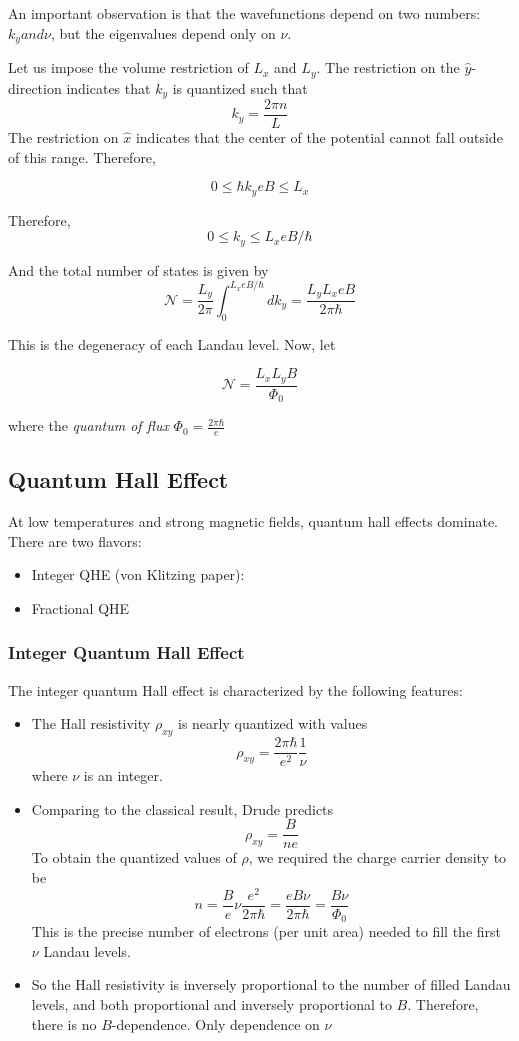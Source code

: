 \documentclass[10pt]{article}
\begin{document}
An important observation is that the wavefunctions depend on two numbers: $k_{y} and \nu$, but the eigenvalues depend only on $\nu$.

Let us impose the volume restriction of $L_{x}$ and $L_{y}$. The restriction on the $\hat{y}$-direction indicates that $k_{y}$ is
quantized such that
$$
k_{y} = \frac{2\pi n}{L}
$$
The restriction on $\hat{x}$ indicates that the center of the potential cannot fall outside of this range. Therefore,

$$
0 \leq \hbar k_{y}{eB} \leq L_{x}
$$

Therefore,
$$
0 \leq k_{y} \leq L_{x}eB/\hbar
$$

And the total number of states is given by
$$
\mathcal{N} = \frac{L_{y}}{2\pi} \int_{0}^{L_{x}eB/\hbar} dk_{y} =  \frac{L_{y}L_{x}eB}{2\pi\hbar}
$$

This is the degeneracy of each Landau level. Now, let

$$
\mathcal{N} = \frac{L_{x}L_{y}B}{\Phi_{0}}
$$

where the \emph{quantum of flux} $\Phi_{0} = \frac{2\pi\hbar}{e}$
\subsection{Quantum Hall Effect}

At low temperatures and strong magnetic fields, quantum hall effects dominate. There are two flavors:
\begin{itemize}
  \item Integer QHE (von Klitzing paper):
  \item Fractional QHE
\end{itemize}

\subsubsection{Integer Quantum Hall Effect}
The integer quantum Hall effect is characterized by the following features:
\begin{itemize}
  \item The Hall resistivity $\rho_{xy}$ is nearly quantized with values
  $$
    \rho_{xy} = \frac{2\pi\hbar}{e^{2}}\frac{1}{\nu}
  $$
  where $\nu$ is an integer.
  \item Comparing to the classical result, Drude predicts
  $$
    \rho_{xy} = \frac{B}{ne}
  $$
  To obtain the quantized values of $\rho$, we required the charge carrier density to be
  $$
    n = \frac{B}{e}\nu\frac{e^{2}}{2\pi\hbar} = \frac{eB\nu}{2\pi\hbar} = \frac{B\nu}{\Phi_{0}}
  $$
  This is the precise number of electrons (per unit area) needed to fill the first $\nu$ Landau levels.
  \item So the Hall resistivity is inversely proportional to the number of filled Landau levels, and both proportional and inversely proportional to $B$. Therefore, there is no $B$-dependence. Only dependence on $\nu$
\end{itemize}
\end{document}
